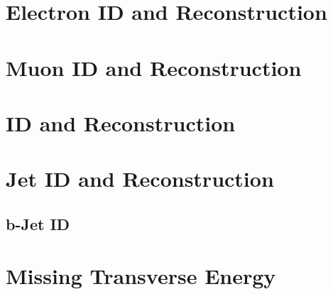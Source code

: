 
\section{Electron ID and Reconstruction}




\section{Muon ID and Reconstruction}





\section{\tau ID and Reconstruction}

\section{Jet ID and Reconstruction}

\subsection{b-Jet ID}
\section{Missing Transverse Energy}
